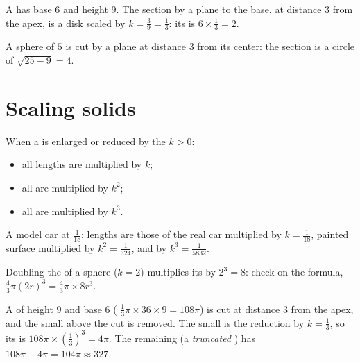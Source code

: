 \begin{example}\label{ex:g9:solids:section}
A  has base  $6$ and height $9$. The section by a plane
 to the base, at distance $3$ from the apex, is a disk scaled by
$k = \frac39 = \frac13$: its  is $6 \times \frac13 = 2$.

A sphere of  $5$ is cut by a plane at distance $3$ from its
center: the section is a circle of  $\sqrt{25 - 9} = 4$.
\end{example}

\section{Scaling solids}

\begin{theorem}\label{thm:g9:solids:scaling}
When a  is enlarged or reduced by the  $k > 0$:
\begin{itemize}
  \item all lengths are multiplied by $k$;
  \item all  are multiplied by $k^2$;
  \item all  are multiplied by $k^3$.
\end{itemize}
\end{theorem}
\admitted

\begin{example}\label{ex:g9:solids:scaling}
A model car at  $\frac{1}{18}$: lengths are those of the real car
multiplied by $k = \frac{1}{18}$, painted surface multiplied by
$k^2 = \frac{1}{324}$, and  by $k^3 = \frac{1}{5832}$.

Doubling the  of a sphere ($k = 2$) multiplies its  by
$2^3 = 8$: check on the formula,
$\frac43\pi (2r)^3 = \frac43 \pi \times 8r^3$.
\end{example}

\begin{example}\label{ex:g9:solids:truncated}
A  of height $9$ and base  $6$ (
$\frac13 \pi \times 36 \times 9 = 108\pi$) is cut at distance $3$ from
the apex, and the small  above the cut is removed. The small  is
the reduction by $k = \frac13$, so its  is
$108\pi \times \left(\frac13\right)^3 = 4\pi$. The remaining  (a
\emph{truncated }) has  $108\pi - 4\pi = 104\pi \approx 327$.
\end{example}

